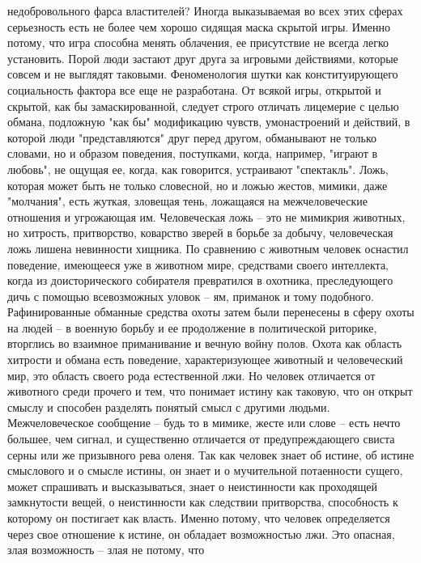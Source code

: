 \documentclass[12pt]{article}
\begin{document}
недобровольного фарса властителей? Иногда выказываемая во всех этих сферах серьезность есть не более чем
хорошо сидящая маска скрытой игры. Именно потому, что игра способна менять облачения, ее присутствие не
всегда  легко  установить.  Порой  люди  застают  друг  друга  за  игровыми  действиями,  которые  совсем  и  не
выглядят  таковыми.  Феноменология  шутки  как  конституирующего  социальность  фактора  все  еще  не
разработана. От всякой игры, открытой и скрытой, как бы замаскированной, следует строго отличать лицемерие
с  целью  обмана,  подложную  "как  бы"  модификацию  чувств,  умонастроений  и  действий,  в  которой  люди
"представляются" друг перед другом, обманывают не только словами, но и образом поведения, поступками,
когда, например, "играют в любовь", не ощущая ее, когда, как говорится, устраивают "спектакль". Ложь, которая
может быть не только словесной, но и ложью жестов, мимики, даже "молчания", есть жуткая, зловещая тень,
ложащаяся  на  межчеловеческие  отношения  и  угрожающая  им.  Человеческая  ложь  --  это  не  мимикрия
животных,  но  хитрость,  притворство,  коварство  зверей  в  борьбе  за  добычу,  человеческая  ложь  лишена
невинности хищника. По сравнению с животным человек оснастил поведение, имеющееся уже в животном
мире,  средствами  своего  интеллекта,  когда  из  доисторического  собирателя  превратился  в  охотника,
преследующего дичь с помощью всевозможных уловок -- ям, приманок и тому подобного. Рафинированные
обманные  средства  охоты  затем  были  перенесены  в  сферу  охоты  на  людей  --  в  военную  борьбу  и  ее
продолжение в политической риторике, вторглись во взаимное приманивание и вечную войну полов. Охота как
область хитрости и обмана есть поведение, характеризующее животный и человеческий мир, это область своего
рода естественной лжи. Но человек отличается от животного среди прочего и тем, что понимает истину как
таковую, что он открыт смыслу и способен разделять понятый смысл с другими людьми. Межчеловеческое
сообщение -- будь то в мимике, жесте или слове -- есть нечто большее, чем сигнал, и существенно отличается от
предупреждающего свиста серны или же призывного рева оленя. Так как человек знает об истине, об истине
смыслового  и  о  смысле  истины,  он  знает  и  о  мучительной  потаенности  сущего,  может  спрашивать  и
высказываться,  знает  о  неистинности  как  проходящей  замкнутости  вещей,  о  неистинности  как  следствии
притворства, способность к которому он постигает как власть. Именно потому, что человек определяется через
свое отношение к истине, он обладает возможностью лжи. Это опасная, злая возможность -- злая не потому, что
\end{document}
